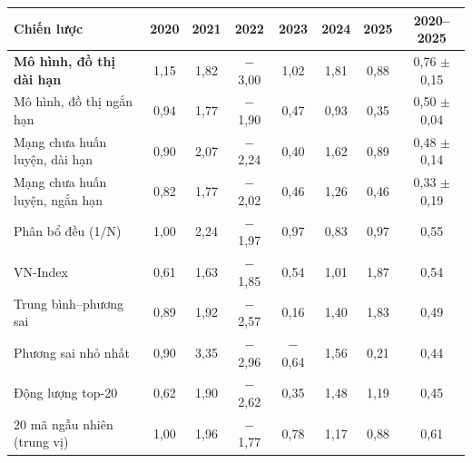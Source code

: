 \begin{tabular}{@{}lccccccc@{}}
\toprule
Chiến lược & 2020 & 2021 & 2022 & 2023 & 2024 & 2025 & 2020--2025 \\
\midrule
\textbf{Mô hình, đồ thị dài hạn} & 1{,}15 & 1{,}82 & $-$3{,}00 & 1{,}02 & 1{,}81 & 0{,}88 & 0{,}76 $\pm$ 0{,}15 \\
Mô hình, đồ thị ngắn hạn & 0{,}94 & 1{,}77 & $-$1{,}90 & 0{,}47 & 0{,}93 & 0{,}35 & 0{,}50 $\pm$ 0{,}04 \\
Mạng chưa huấn luyện, dài hạn & 0{,}90 & 2{,}07 & $-$2{,}24 & 0{,}40 & 1{,}62 & 0{,}89 & 0{,}48 $\pm$ 0{,}14 \\
Mạng chưa huấn luyện, ngắn hạn & 0{,}82 & 1{,}77 & $-$2{,}02 & 0{,}46 & 1{,}26 & 0{,}46 & 0{,}33 $\pm$ 0{,}19 \\
\midrule
Phân bổ đều (1/N) & 1{,}00 & 2{,}24 & $-$1{,}97 & 0{,}97 & 0{,}83 & 0{,}97 & 0{,}55 \\
VN-Index & 0{,}61 & 1{,}63 & $-$1{,}85 & 0{,}54 & 1{,}01 & 1{,}87 & 0{,}54 \\
Trung bình--phương sai & 0{,}89 & 1{,}92 & $-$2{,}57 & 0{,}16 & 1{,}40 & 1{,}83 & 0{,}49 \\
Phương sai nhỏ nhất & 0{,}90 & 3{,}35 & $-$2{,}96 & $-$0{,}64 & 1{,}56 & 0{,}21 & 0{,}44 \\
Động lượng top-20 & 0{,}62 & 1{,}90 & $-$2{,}62 & 0{,}35 & 1{,}48 & 1{,}19 & 0{,}45 \\
20 mã ngẫu nhiên (trung vị) & 1{,}00 & 1{,}96 & $-$1{,}77 & 0{,}78 & 1{,}17 & 0{,}88 & 0{,}61 \\
\bottomrule
\end{tabular}
